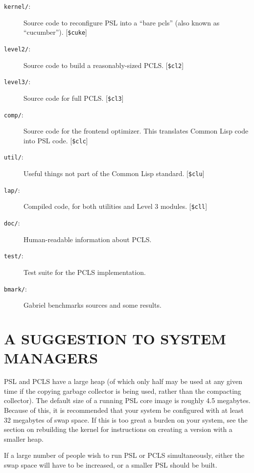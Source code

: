 \begin{description}

\item[{\tt kernel/}:]
Source code to reconfigure PSL into a ``bare pcls'' (also known
as ``cucumber''). [{\tt \$cuke}]

\item[{\tt level2/}:]
Source code to build a reasonably-sized PCLS.  [{\tt \$cl2}]

\item[{\tt level3/}:]
Source code for full PCLS.  [{\tt \$cl3}]

\item[{\tt comp/}:]
Source code for the frontend optimizer.  This translates Common Lisp
code into PSL code. [{\tt \$clc}]

\item[{\tt util/}:]
Useful things not part of the Common Lisp standard.  [{\tt \$clu}]

\item[{\tt lap/}:]
Compiled code, for both utilities and Level 3 modules.  [{\tt \$cll}]

\item[{\tt doc/}:]
Human-readable information about PCLS.

\item[{\tt test/}:]
Test suite for the PCLS implementation.

\item[{\tt bmark/}:]
Gabriel benchmarks sources and some results.

\end{description}

\section{A SUGGESTION TO SYSTEM MANAGERS}

PSL and PCLS have a large heap (of which only half may be used at any
given time if the copying garbage collector is being used, rather than
the compacting collector).  The default size of a running PSL core
image is roughly 4.5 megabytes.  Because of this, it is recommended
that your system be configured with at least 32 megabytes of swap
space.  If this is too great a burden on your system, see the section
on rebuilding the kernel for instructions on creating a version with a
smaller heap.

If a large number of people wish to run PSL or PCLS simultaneously, either
the swap space will have to be increased, or a smaller PSL should be built.

